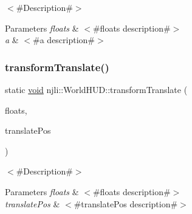 $<$\#\+Description\#$>$


\begin{DoxyParams}{Parameters}
{\em floats} & $<$\#floats description\#$>$ \\
\hline
{\em a} & $<$\#a description\#$>$ \\
\hline
\end{DoxyParams}
\mbox{\label{classnjli_1_1_world_h_u_d_abc1f08b9511cee6d0642bcb2aac75ce0}} 
\subsubsection{\texorpdfstring{transform\+Translate()}{transformTranslate()}\hspace{0.1cm}{\footnotesize\ttfamily [1/2]}}
{\footnotesize\ttfamily static \mbox{\hyperlink{_thread_8h_af1e856da2e658414cb2456cb6f7ebc66}{void}} njli\+::\+World\+H\+U\+D\+::transform\+Translate (\begin{DoxyParamCaption}\item[{bt\+Matrix3x3 \&}]{floats,  }\item[{const bt\+Vector2 \&}]{translate\+Pos }\end{DoxyParamCaption})\hspace{0.3cm}{\ttfamily [static]}}

$<$\#\+Description\#$>$


\begin{DoxyParams}{Parameters}
{\em floats} & $<$\#floats description\#$>$ \\
\hline
{\em translate\+Pos} & $<$\#translate\+Pos description\#$>$ \\
\hline
\end{DoxyParams}
\mbox{\label{classnjli_1_1_world_h_u_d_a64d5d8707fd3ed3f9df794e55a3fb4af}} 
